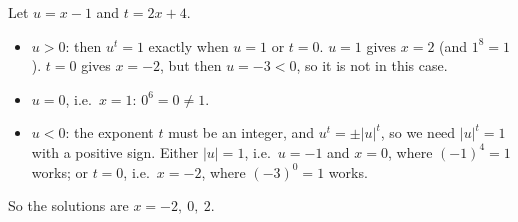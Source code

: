 Let $u=x-1$ and $t=2x+4$.
\begin{itemize}
\item $u>0$: then $u^t=1$ exactly when $u=1$ or $t=0$. $u=1$ gives $x=2$ (and $1^8=1$). $t=0$ gives $x=-2$, but then $u=-3<0$, so it is not in this case.
\item $u=0$, i.e.\ $x=1$: $0^6=0\ne1$.
\item $u<0$: the exponent $t$ must be an integer, and $u^t=\pm|u|^t$, so we need $|u|^t=1$ with a positive sign. Either $|u|=1$, i.e.\ $u=-1$ and $x=0$, where $(-1)^4=1$ works; or $t=0$, i.e.\ $x=-2$, where $(-3)^0=1$ works.
\end{itemize}
So the solutions are $\boxed{x=-2,\ 0,\ 2}$.
